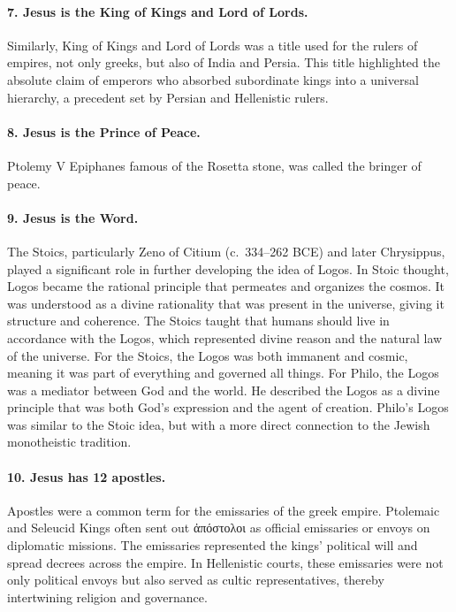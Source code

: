 \paragraph{7.
Jesus is the King of Kings and Lord of Lords.}\label{par:jesus-is-the-king-of-kings-and-lord-of-lords.}
Similarly, King of Kings and Lord of Lords was a title used for the rulers of empires, not only greeks, but also of India and Persia. This title highlighted the absolute claim of emperors who absorbed subordinate kings into a universal hierarchy, a precedent set by Persian and Hellenistic rulers.
\paragraph{8.
Jesus is the Prince of Peace.}\label{par:jesus-is-the-prince-of-peace.}

Ptolemy V Epiphanes famous of the Rosetta stone, was called the bringer of peace.
\paragraph{9.
Jesus is the Word.}\label{par:jesus-is-the-word.}
The Stoics, particularly Zeno of Citium (c.~334–262 BCE) and later Chrysippus, played a significant role in further developing the idea of Logos.
In Stoic thought, Logos became the rational principle that permeates and organizes the cosmos.
It was understood as a divine rationality that was present in the universe, giving it structure and coherence.
The Stoics taught that humans should live in accordance with the Logos, which represented divine reason and the natural law of the universe.
For the Stoics, the Logos was both immanent and cosmic, meaning it was part of everything and governed all things.
For Philo, the Logos was a mediator between God and the world.
He described the Logos as a divine principle that was both God’s expression and the agent of creation.
Philo’s Logos was similar to the Stoic idea, but with a more direct connection to the Jewish monotheistic tradition.
\paragraph{10.
Jesus has 12 apostles.}\label{par:jesus-has-12-apostles.}
Apostles were a common term for the emissaries of the greek empire.
Ptolemaic and Seleucid Kings often sent out ἀπόστολοι as official emissaries or envoys on diplomatic missions.
The emissaries represented the kings’ political will and spread decrees across the empire.
In Hellenistic courts, these emissaries were not only political envoys but also served as cultic representatives, thereby intertwining religion and governance.
